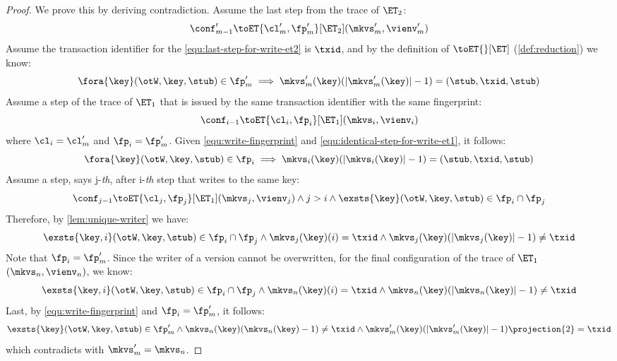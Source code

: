 \begin{proof}
    We prove this by deriving contradiction.
    Assume the last step from the trace of \( \ET_2 \):
    \begin{equation}
        \label{equ:last-step-for-write-et2}
        \conf'_{m-1} \toET{\cl'_m, \fp'_m}[\ET_{2}] (\mkvs'_m, \vienv'_m )
    \end{equation}
    Assume the transaction identifier for the \cref{equ:last-step-for-write-et2} is \( \txid \), and by the definition of \( \toET{}[\ET]\) (\cref{def:reduction}) we know:
    \begin{equation}
        \label{equ:write-fingerprint}
        \fora{\key} (\otW, \key, \stub) \in \fp'_m \implies \mkvs'_m(\key)(\lvert\mkvs'_m(\key)\rvert - 1) = (\stub, \txid, \stub)
    \end{equation}
    Assume a step of the trace of \( \ET_1 \) that is issued by the same transaction identifier with the same fingerprint:
    \begin{equation}
        \label{equ:identical-step-for-write-et1}
        \conf_{i-1} \toET{\cl_i, \fp_i}[\ET_{1}] (\mkvs_i, \vienv_i)
    \end{equation}
    where \( \cl_i = \cl'_m \) and \( \fp_i = \fp'_m \).
    Given \cref{equ:write-fingerprint} and \cref{equ:identical-step-for-write-et1}, it follows:
    \[
        \fora{\key} (\otW, \key, \stub) \in \fp_i \implies \mkvs_i(\key)(\lvert\mkvs_i(\key)\rvert - 1) = (\stub, \txid, \stub)
    \]
    Assume a step, says j-\emph{th}, after i-\emph{th} step that writes to the same key:
    \[
        \conf_{j-1} \toET{\cl_j, \fp_j}[\ET_{1}] (\mkvs_j, \vienv_j) 
        \land j > i
        \land \exsts{\key} (\otW, \key, \stub) \in \fp_i \cap \fp_j
    \]
    Therefore, by \cref{lem:unique-writer} we have:
    \[
        \exsts{\key,i} (\otW, \key, \stub) \in \fp_i \cap \fp_j \land \mkvs_j(\key)(i) = \txid \land \mkvs_j(\key)(\lvert \mkvs_j(\key) \rvert - 1) \neq \txid
    \]
    Note that \( \fp_i = \fp'_m\).
    Since the writer of a version cannot be overwritten, for the final configuration of the trace of \( \ET_1 \) \((\mkvs_n, \vienv_n)\), we know:
    \[
        \exsts{\key,i} (\otW, \key, \stub) \in \fp_i \cap \fp_j \land \mkvs_n(\key)(i) = \txid \land \mkvs_n(\key)(\lvert \mkvs_n(\key) \rvert - 1) \neq \txid
    \]
    Last, by \cref{equ:write-fingerprint} and \( \fp_i = \fp'_m\), it follows:
    \[
        \exsts{\key} (\otW, \key, \stub) \in \fp'_m \land \mkvs_n(\key)(\mkvs_n(\key) - 1) \neq \txid \land \mkvs'_m(\key)(\lvert\mkvs'_m(\key)\rvert - 1)\projection{2} = \txid
    \]
    which contradicts with \( \mkvs'_m = \mkvs_n\).
\end{proof}

